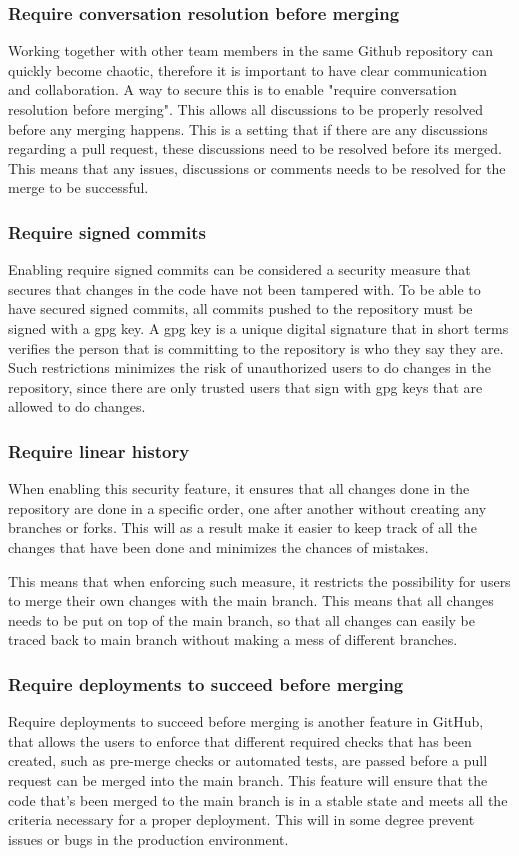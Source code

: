 \subsubsection{Require conversation resolution before merging}
Working together with other team members in the same Github repository can quickly become chaotic, therefore it is important to have clear communication and collaboration. A way to secure this is to enable "require conversation resolution before merging". This allows all discussions to be properly resolved before any merging happens. This is a setting that if there are any discussions regarding a pull request, these discussions need to be resolved before its merged. This means that any issues, discussions or comments needs to be resolved for the merge to be successful. 
\\
\subsubsection{Require signed commits}
Enabling require signed commits can be considered a security measure that secures that changes in the code have not been tampered with. 
To be able to have secured signed commits, all commits pushed to the repository must be signed with a \acrlong{gpg} key. A \acrshort{gpg} key is  a unique digital signature that in short terms verifies the person that is committing to the repository is who they say they are. 
Such restrictions minimizes the risk of unauthorized users to do changes in the repository, since there are only trusted users that sign with \acrshort{gpg} keys that are allowed to do changes. 

\subsubsection{Require linear history}
When enabling this security feature, it ensures that all changes done in the repository are done in a specific order, one after another without creating any branches or forks. This will as a result make it easier to keep track of all the changes that have been done and minimizes the chances of mistakes. 

This means that when enforcing such measure, it restricts the possibility for users to merge their own changes with the main branch. This means that all changes needs to be put on top of the main branch, so that all changes can easily be traced back to main branch without making a mess of different branches. 
\newpage

\subsubsection{Require deployments to succeed before merging}
Require deployments to succeed before merging is another feature in GitHub, that allows the users to enforce that different required checks that has been created, such as pre-merge checks or automated tests, are passed before a pull request can be merged into the main branch. This feature will ensure that the code that's been merged to the main branch is in a stable state and meets all the criteria necessary for a proper deployment. This will in some degree prevent issues or bugs in the production environment. 

